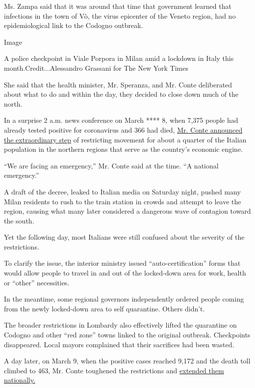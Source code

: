 Ms. Zampa said that it was around that time that government learned that
infections in the town of Vò, the virus epicenter of the Veneto region,
had no epidemiological link to the Codogno outbreak.

Image

A police checkpoint in Viale Porpora in Milan amid a lockdown in Italy
this month.Credit...Alessandro Grassani for The New York Times

She said that the health minister, Mr. Speranza, and Mr. Conte
deliberated about what to do and within the day, they decided to close
down much of the north.

In a surprise 2 a.m. news conference on March **** 8, when 7,375 people
had already tested positive for coronavirus and 366 had died,
\href{https://www.nytimes3xbfgragh.onion/2020/03/07/world/europe/coronavirus-italy.html?action=click\&module=RelatedLinks\&pgtype=Article}{Mr.
Conte announced the extraordinary step} of restricting movement for
about a quarter of the Italian population in the northern regions that
serve as the country's economic engine.

``We are facing an emergency,'' Mr. Conte said at the time. ``A national
emergency.''

A draft of the decree, leaked to Italian media on Saturday night, pushed
many Milan residents to rush to the train station in crowds and attempt
to leave the region, causing what many later considered a dangerous wave
of contagion toward the south.

Yet the following day, most Italians were still confused about the
severity of the restrictions.

To clarify the issue, the interior ministry issued
``auto-certification'' forms that would allow people to travel in and
out of the locked-down area for work, health or ``other'' necessities.

In the meantime, some regional governors independently ordered people
coming from the newly locked-down area to self quarantine. Others
didn't.

The broader restrictions in Lombardy also effectively lifted the
quarantine on Codogno and other ``red zone'' towns linked to the
original outbreak. Checkpoints disappeared. Local mayors complained that
their sacrifices had been wasted.

A day later, on March 9, when the positive cases reached 9,172 and the
death toll climbed to 463, Mr. Conte toughened the restrictions and
\href{https://www.nytimes3xbfgragh.onion/2020/03/09/world/europe/italy-lockdown-coronavirus.html?action=click\&module=RelatedLinks\&pgtype=Article}{extended
them nationally.}

